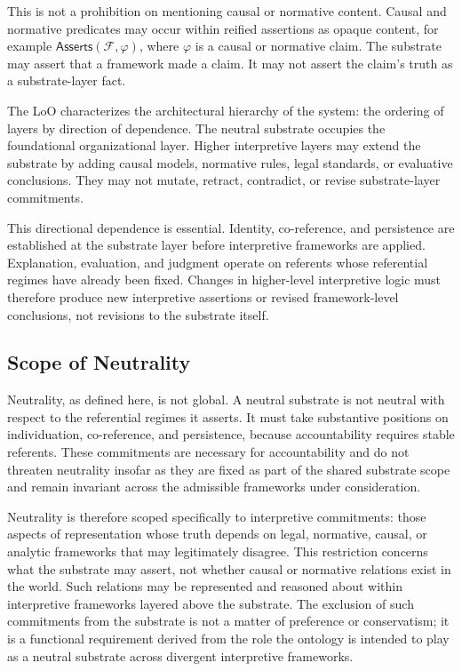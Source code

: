This is not a prohibition on mentioning causal or normative content.
Causal and normative predicates may occur within reified assertions
as opaque content, for example
$\mathsf{Asserts}(\mathcal{F}, \varphi)$,
where $\varphi$ is a causal or normative claim.
The substrate may assert that a framework made a claim.
It may not assert the claim's truth as a substrate-layer fact.

The LoO characterizes the architectural hierarchy of the system:
the ordering of layers by direction of dependence.
The neutral substrate occupies the foundational organizational layer.
Higher interpretive layers may extend the substrate
by adding causal models, normative rules, legal standards,
or evaluative conclusions.
They may not mutate, retract, contradict,
or revise substrate-layer commitments.

This directional dependence is essential.
Identity, co-reference, and persistence are established
at the substrate layer before interpretive frameworks are applied.
Explanation, evaluation, and judgment operate on referents
whose referential regimes have already been fixed.
Changes in higher-level interpretive logic must therefore produce
new interpretive assertions or revised framework-level conclusions,
not revisions to the substrate itself.

\subsection{Scope of Neutrality}
\label{subsec:scope}

Neutrality, as defined here, is not global.
A neutral substrate is not neutral with respect to
the referential regimes it asserts.
It must take substantive positions on individuation,
co-reference, and persistence,
because accountability requires stable referents.
These commitments are necessary for accountability
and do not threaten neutrality insofar as they are fixed
as part of the shared substrate scope
and remain invariant
across the admissible frameworks under consideration.

Neutrality is therefore scoped specifically to interpretive commitments:
those aspects of representation whose truth depends on
legal, normative, causal, or analytic frameworks
that may legitimately disagree.
This restriction concerns what the substrate may assert,
not whether causal or normative relations exist in the world.
Such relations may be represented and reasoned about within
interpretive frameworks layered above the substrate.
The exclusion of such commitments from the substrate
is not a matter of preference or conservatism;
it is a functional requirement derived from
the role the ontology is intended to play
as a neutral substrate across divergent interpretive frameworks.

